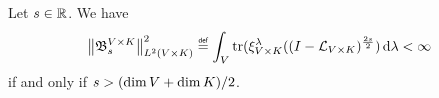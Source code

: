 \begin{proposition}
    Let $s \in \mathbb{R}$.
    We have
    \begin{align*}
        \norm [\Lebesgue 2 \GroupDirect] {\BesselPotentialKernel [\GroupDirect] {s}}^2
        \defeq \int_\VectorSpace \tr(\Rep [\GroupDirect] \lambda (\BesselPotential [\GroupDirect] {2s}) \dd \lambda < \infty
    \end{align*}
    if and only if $s > (\dim V + \dim K) / 2$.
\end{proposition}

%
%
